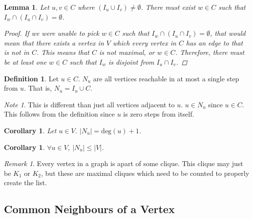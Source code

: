 \documentclass{article}
\theoremstyle{plain}
\newtheorem{lem}[thm]{Lemma}
\newtheorem{cor}[thm]{Corollary}
\theoremstyle{definition}
\newtheorem{defn}{Definition}[]
\theoremstyle{remark}
\newtheorem*{rem}{Remark}
\newtheorem*{note}{Note}
\newcommand{\vdeg}[1]{ {\text{deg}({#1})} }
\newcommand{\ignv}[1]{ {I_{#1}} }
\newcommand{\nev}[1]{ {N_{#1}} }
\begin{document}
\begin{lem}
    Let \(u, v \in C\) where \((\ignv{u} \cup \ignv{v}) \neq \emptyset\). There must exist
    \(w \in C\) such that \(\ignv{w} \cap (\ignv{u} \cap \ignv{v}) = \emptyset\).
    \begin{proof}
        If we were unable to pick \(w \in C\) such that
        \(\ignv{w} \cap (\ignv{u} \cap \ignv{v}) = \emptyset\), that would mean that there
        exists a vertex in \(V\) which every vertex in \(C\) has an edge to that is not in
        \(C\). This means that \(C\) is not maximal, or \(w \in C\). Therefore, there must
        be at least one \(w \in C\) such that \(\ignv{w}\) is disjoint from
        \(\ignv{u} \cap \ignv{v}\).
    \end{proof}
    \label{disjoint_neighbours}
\end{lem}

\begin{defn}
    Let \(u \in C\). \(\nev{u}\) are all vertices reachable in at most a single step from
    \(u\). That is, \(\nev{u} = \ignv{u} \cup C\).
    \begin{note}
        This is different than just all vertices adjacent to \(u\). \(u \in \nev{u}\)
        since \(u \in C\). This follows from the definition since \(u\) is zero steps from
        itself.
    \end{note}
\end{defn}

\begin{cor}
    Let \(u \in V\). \(|\nev{u}| = \vdeg{u} + 1\).
\end{cor}

\begin{cor}
    \(\forall u \in V\), \(|\nev{u}| \leq |V|\). \label{neighbour_size}
\end{cor}

\begin{rem}
    Every vertex in a graph is apart of some clique. This clique may just be \(K_1\) or
    \(K_2\), but these are maximal cliques which need to be counted to properly create the
    list.
\end{rem}

\subsection{Common Neighbours of a Vertex}
\end{document}
